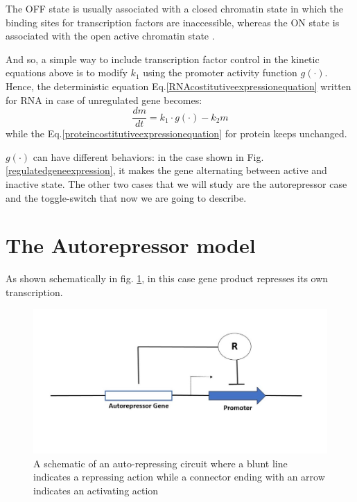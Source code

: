 \documentclass[12pt,a4paper]{report}
\begin{document}
The OFF state is usually associated with a closed chromatin state in which the binding sites for transcription factors are inaccessible, whereas the ON state is associated with the open active chromatin state \cite{geneexpressionnoise}.

And so, a simple way to include transcription factor control in the kinetic equations above is to modify $k_{1}$ using the promoter activity function $g( \cdot )$. Hence, the deterministic equation Eq.\ref{RNAcostitutiveexpressionequation} written for RNA in case of unregulated gene becomes:
\begin{equation}\label{regulatedgeneequation}
 \frac{dm}{dt} = k_{1} \cdot g(\cdot) - k_{2}m
\end{equation}
while the Eq.\ref{proteincostitutiveexpressionequation} for protein keeps unchanged.

$g( \cdot )$ can have different behaviors: in the case shown in Fig. \ref{regulatedgeneexpression}, it makes the gene alternating between active and inactive state. The other two cases that we will study are the autorepressor case and the toggle-switch that now we are going to describe.






\section{The Autorepressor model}

As shown schematically in fig. \ref{autorepressor}, in this case gene product represses its own transcription. 


\begin{figure}[!ht]
\centering
\includegraphics[scale=0.50]{autorepressor.jpg}
\caption{A schematic of an auto-repressing circuit where a blunt line indicates a repressing action while a connector ending with an arrow indicates an activating action}
\label{autorepressor}
\end{figure}
\end{document}
